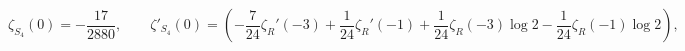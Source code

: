 \begin{equation}
\zeta_{S_4}(0)=-\frac{17}{2880},\qquad
\zeta'_{S_4}(0)=\left(-\frac7{24}\zeta_R'(-3)+\frac1{24}\zeta_R'(-1)
+\frac1{24}\zeta_R(-3)\log2-\frac1{24}\zeta_R(-1)\log2\right)\label{zpsphere},
\end{equation}

